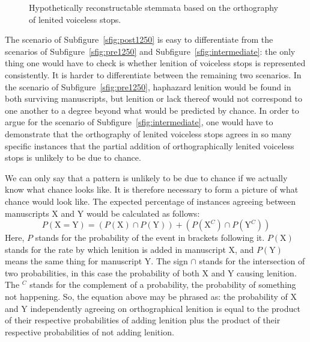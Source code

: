 \begin{figure}[h]
  \centering
  \subfloat[]{
    \label{sfig:pre1250}
    \begin{forest}
      [μ < 1250
      [X > 1300]
      [Y > 1300]]
    \end{forest}}
  \subfloat[]{
    \label{sfig:post1250}
    \begin{forest}
      [μ > 1300
      [X > 1300]
      [Y > 1300]]
    \end{forest}}
  \caption{Hypothetically reconstructable stemmata based on the orthography of lenited voiceless stops.}
  \label{fig:possiblestemmata}
\end{figure}

The scenario of Subfigure~\ref{sfig:post1250} is easy to differentiate from the scenarios of Subfigure~\ref{sfig:pre1250} and Subfigure~\ref{sfig:intermediate}: the only thing one would have to check is whether lenition of voiceless stops is represented consistently. It is harder to differentiate between the remaining two scenarios. In the scenario of Subfigure~\ref{sfig:pre1250}, haphazard lenition would be found in both surviving manuscripts, but lenition or lack thereof would not correspond to one another to a degree beyond what would be predicted by chance. In order to argue for the scenario of Subfigure~\ref{sfig:intermediate}, one would have to demonstrate that the orthography of lenited voiceless stops agrees in so many specific instances that the partial addition of orthographically lenited voiceless stops is unlikely to be due to chance.

We can only say that a pattern is unlikely to be due to chance if we actually know what chance looks like. It is therefore necessary to form a picture of what chance would look like. The expected percentage of instances agreeing between manuscripts X and Y would be calculated as follows:
\[P(\text{X} = \text{Y}) = (P(\text{X}) \cap P(\text{Y})) + (P(\text{X}^C) \cap P(\text{Y}^C))\]
Here, \(P\) stands for the probability of the event in brackets following it.  \(P(\text{X})\) stands for the rate by which lenition is added in manuscript X, and \(P(\text{Y})\) means the same thing for manuscript Y. The sign \(\cap\) stands for the intersection of two probabilities, in this case the probability of both X and Y causing lenition. The \(^C\) stands for the complement of a probability, \ie the probability of something not happening. So, the equation above may be phrased as: the probability of X and Y independently agreeing on orthographical lenition is equal to the product of their respective probabilities of adding lenition plus the product of their respective probabilities of not adding lenition.

